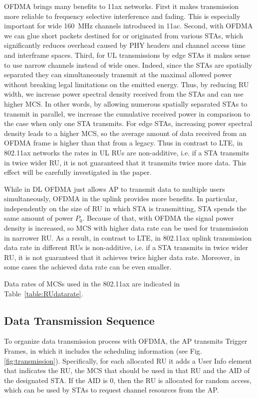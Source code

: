 OFDMA brings many benefits to 11ax networks.
First it makes transmission more reliable to frequency selective interference and fading.
This is especially important for wide \SI{160}{MHz} channels introduced in 11ac.
Second, with OFDMA we can glue short packets destined for or originated from various STAs, which significantly reduces overhead caused by PHY headers and channel access time and interframe spaces.
Third, for UL transmissions by edge STAs it makes sense to use narrow channels instead of wide ones.
Indeed, since the STAs are spatially separated they can simultaneously transmit at the maximal allowed power without breaking legal limitations on the emitted energy.
Thus, by reducing RU width, we increase power spectral density received from the STAs and can use higher MCS.
In other words, by allowing numerous spatially separated STAs to transmit in parallel, we increase the cumulative received power in comparison to the case when only one STA transmits.
For edge STAs, increasing power spectral density leads to a higher MCS, so  the average amount of data received from an OFDMA frame is higher than that from a legacy.
Thus in contrast to LTE, in 802.11ax networks the rates in UL RUs are non-additive, i.e. if a STA transmits in twice wider RU, it is not guaranteed that it transmits twice more data.
This effect will be carefully investigated in the paper.

While in DL OFDMA just allows AP to transmit data to multiple users simultaneously, OFDMA in the uplink provides more benefits. In particular, independently on the size of RU in which STA is transmitting, STA spends the same amount of power $P_0$. Because of that, with OFDMA the signal power density is increased, so MCS with higher data rate can be used for transmission in narrower RU. As a result, in contrast to LTE, in 802.11ax uplink transmission data rate in different RUs is non-additive, i.e. if a STA transmits in twice wider RU, it is not guaranteed that it achieves twice higher data rate. Moreover, in some cases the achieved data rate can be even smaller.

Data rates of MCSs used in the 802.11ax are indicated in Table~\ref{table:RUdatarate}.

\subsection{Data Transmission Sequence}
To organize data transmission process with OFDMA, the AP transmits Trigger Frames, in which it includes the scheduling information (see Fig. \ref{fig:transmission}).
Specifically, for each allocated RU it adds a User Info element that indicates the RU, the MCS that should be used in that RU and the AID of the designated STA.
If the AID is $0$, then the RU is allocated for random access, which can be used by STAs to request channel resources from the AP.

